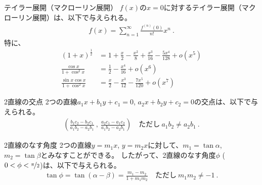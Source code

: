 




\begin{Formula}[label=formula:taylorexpansion]{テイラー展開（マクローリン展開）}
$f(x)$の$x = 0$に対するテイラー展開（マクローリン展開）は、以下で与えられる。
\begin{align*}
  f(x) = \sum_{n=1}^{\infty}\frac{f^{(n)}(0)}{n!}x^n\ .
\end{align*}
特に、
\begin{align*}
  (1+x)^\frac12 &= 1+\frac x2-\frac{x^2}8+\frac{x^3}{16}-\frac{5x^4}{128}+o\!\left(x^5\right)\\
  \frac{\cos x}{1+\cos^2x} &= \frac12-\frac{x^4}{16}+o\left(x^6\right)\\
  \frac{\sin x\cos x}{1+\cos^2x} &= \frac x2-\frac{x^3}{12}-\frac{7x^5}{120}+o\left(x^7\right)
\end{align*}
\end{Formula}



\begin{Formula}[label=formula:intersectionof2lines]{2直線の交点}
2つの直線$a_1x+b_1y+c_1 = 0$, $a_2x+b_2y+c_2 = 0$の交点は、以下で与えられる。
\begin{align*}
  \left(
  \frac{b_1c_2-b_2c_1}{a_1b_2-a_2b_1}~,~
  \frac{a_2c_1-a_1c_2}{a_1b_2-a_2b_1}
  \right)
  \quad\text{ただし}~
  a_1b_2 \ne a_2b_1\ .
\end{align*}
\end{Formula}

\begin{Formula}[label=formula:anblebetween2lines]{2直線のなす角度}
2つの直線$y = m_1x$, $y = m_2x$に対して、$m_1 = \tan\alpha$, $m_2 = \tan\beta$とみなすことができる。
したがって、2直線のなす角度$\phi$ ($0 < \phi < \nicefrac\pi2$)は、以下で与えられる。
\begin{align*}
  \tan\phi = \tan(\alpha-\beta) = \frac{m_1-m_2}{1+m_1m_2}
  \quad\text{ただし}~
  m_1m_2 \ne -1\ .
\end{align*}
\end{Formula}



